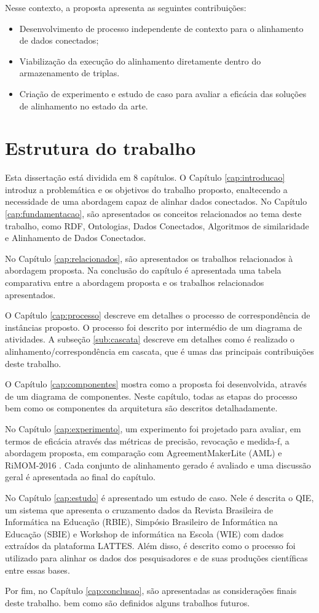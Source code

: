 Nesse contexto, a proposta apresenta as seguintes contribuições:
\begin{itemize}
\item Desenvolvimento de processo independente de contexto para o alinhamento de dados conectados;
\item Viabilização da execução do alinhamento diretamente dentro do armazenamento de triplas.
\item  Criação de experimento e estudo de caso para avaliar a eficácia das soluções de alinhamento no estado da arte.
\end{itemize}

\section{Estrutura do trabalho}

Esta dissertação está dividida em 8 capítulos. O Capítulo \ref{cap:introducao} introduz a problemática e os objetivos do trabalho proposto, enaltecendo a necessidade de uma abordagem capaz de alinhar dados conectados. No Capítulo \ref{cap:fundamentacao}, são apresentados os conceitos relacionados ao tema deste trabalho, como RDF, Ontologias, Dados Conectados, Algoritmos de similaridade e Alinhamento de Dados Conectados.

No Capítulo \ref{cap:relacionados}, são apresentados os trabalhos relacionados à abordagem proposta. Na conclusão do capítulo é apresentada uma tabela comparativa entre a abordagem proposta e os trabalhos relacionados apresentados.

O Capítulo \ref{cap:processo} descreve em detalhes o processo de correspondência de instâncias proposto. O processo foi descrito por intermédio de um diagrama de atividades. A subseção \ref{sub:cascata} descreve em detalhes como é realizado o alinhamento/correspondência em cascata, que é umas das principais contribuições deste trabalho.

O Capítulo \ref{cap:componentes} mostra como a proposta foi desenvolvida, através de um diagrama de componentes. Neste capítulo, todas as etapas do processo bem como os componentes da arquitetura são descritos detalhadamente.

No Capítulo \ref{cap:experimento}, um experimento foi projetado para avaliar, em termos de eficácia através das métricas de precisão, revocação e medida-f, a abordagem proposta, em comparação com AgreementMakerLite (AML) \cite{fariaoaei} e RiMOM-2016 \cite{zhang2016rimom}. Cada conjunto de alinhamento gerado é avaliado e uma discussão geral é apresentada ao final do capítulo.

No Capítulo \ref{cap:estudo} é apresentado um estudo de caso. Nele é descrita o QIE, um sistema que apresenta o cruzamento dados da Revista Brasileira de Informática na Educação (RBIE), Simpósio Brasileiro de Informática na Educação (SBIE) e Workshop de informática na Escola (WIE) com dados extraídos da plataforma LATTES. Além disso, é descrito como o processo foi utilizado para alinhar os dados dos pesquisadores e de suas produções científicas entre essas bases.


Por fim, no Capítulo \ref{cap:conclusao}, são apresentadas as considerações finais deste trabalho. bem como são definidos alguns trabalhos futuros.
